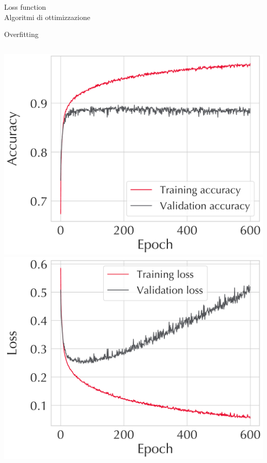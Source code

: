 \documentclass{beamer}
\begin{document}
\begin{frame}{Loss function \\Algoritmi di ottimizzazione}
%
%
%
\end{frame}

\begin{frame}{Overfitting}
  \vspace*{3.5ex}
  \begin{columns}
      \centering
      \includegraphics[width=\linewidth]{./Images/Z64_64_adam_relu_acc.pdf}
      \centering
      \includegraphics[width=\linewidth]{./Images/Z64_64_adam_relu_rock.pdf}
  \end{columns}
\end{frame}
\end{document}
